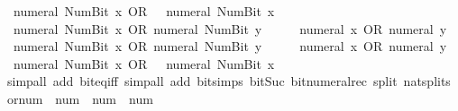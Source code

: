 \begin{isabellebody}
\ \ {\isacartoucheopen}numeral\ {\isacharparenleft}{\kern0pt}Num{\isachardot}{\kern0pt}Bit{}\ x{\isacharparenright}{\kern0pt}\ OR\ {}\ {\isacharequal}{\kern0pt}\ numeral\ {\isacharparenleft}{\kern0pt}Num{\isachardot}{\kern0pt}Bit{}\ x{\isacharparenright}{\kern0pt}{\isacartoucheclose}\isanewline
\ \ {\isacartoucheopen}numeral\ {\isacharparenleft}{\kern0pt}Num{\isachardot}{\kern0pt}Bit{}\ x{\isacharparenright}{\kern0pt}\ OR\ numeral\ {\isacharparenleft}{\kern0pt}Num{\isachardot}{\kern0pt}Bit{}\ y{\isacharparenright}{\kern0pt}\ {\isacharequal}{\kern0pt}\ {}\ {\isacharplus}{\kern0pt}\ {}\ {\isacharasterisk}{\kern0pt}\ {\isacharparenleft}{\kern0pt}numeral\ x\ OR\ numeral\ y{\isacharparenright}{\kern0pt}{\isacartoucheclose}\isanewline
\ \ {\isacartoucheopen}numeral\ {\isacharparenleft}{\kern0pt}Num{\isachardot}{\kern0pt}Bit{}\ x{\isacharparenright}{\kern0pt}\ OR\ numeral\ {\isacharparenleft}{\kern0pt}Num{\isachardot}{\kern0pt}Bit{}\ y{\isacharparenright}{\kern0pt}\ {\isacharequal}{\kern0pt}\ {}\ {\isacharplus}{\kern0pt}\ {}\ {\isacharasterisk}{\kern0pt}\ {\isacharparenleft}{\kern0pt}numeral\ x\ OR\ numeral\ y{\isacharparenright}{\kern0pt}{\isacartoucheclose}\isanewline
\ \ {\isacartoucheopen}numeral\ {\isacharparenleft}{\kern0pt}Num{\isachardot}{\kern0pt}Bit{}\ x{\isacharparenright}{\kern0pt}\ OR\ {}\ {\isacharequal}{\kern0pt}\ numeral\ {\isacharparenleft}{\kern0pt}Num{\isachardot}{\kern0pt}Bit{}\ x{\isacharparenright}{\kern0pt}{\isacartoucheclose}\isanewline
%
\isadelimproof
\ \ %
\endisadelimproof
%
\isatagproof
{}\isamarkupfalse%
\ {\isacharparenleft}{\kern0pt}simp{\isacharunderscore}{\kern0pt}all\ add{\isacharcolon}{\kern0pt}\ bit{\isacharunderscore}{\kern0pt}eq{\isacharunderscore}{\kern0pt}iff{\isacharparenright}{\kern0pt}\ {\isacharparenleft}{\kern0pt}simp{\isacharunderscore}{\kern0pt}all\ add{\isacharcolon}{\kern0pt}\ bit{\isacharunderscore}{\kern0pt}simps\ bit{\isacharunderscore}{\kern0pt}Suc\ bit{\isacharunderscore}{\kern0pt}numeral{\isacharunderscore}{\kern0pt}rec\ split{\isacharcolon}{\kern0pt}\ nat{\isachardot}{\kern0pt}splits{\isacharparenright}{\kern0pt}%
\endisatagproof
{\isafoldproof}%
%
\isadelimproof
\isanewline
%
\endisadelimproof
\isanewline
{}\isamarkupfalse%
\ or{\isacharunderscore}{\kern0pt}num\ {\isacharcolon}{\kern0pt}{\isacharcolon}{\kern0pt}\ {\isacartoucheopen}num\ {\isasymRightarrow}\ num\ {\isasymRightarrow}\ num{\isacartoucheclose}\ \isanewline

\end{isabellebody}
